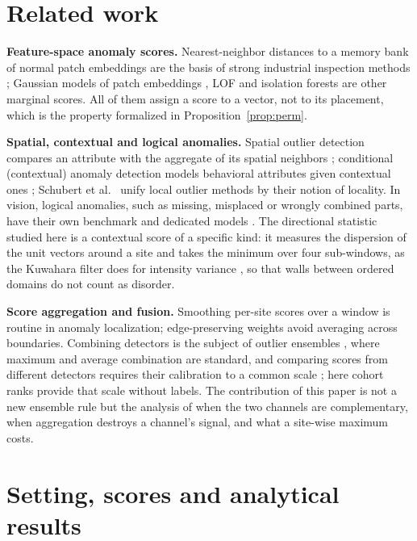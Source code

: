 \documentclass[preprint,review,12pt]{elsarticle}
\begin{document}
\section{Related work}
\textbf{Feature-space anomaly scores.} Nearest-neighbor distances to a memory bank of normal patch embeddings are the basis of strong industrial inspection methods \citep{Roth2022}; Gaussian models of patch embeddings \citep{Defard2021}, LOF \citep{Breunig2000} and isolation forests \citep{Liu2008} are other marginal scores. All of them assign a score to a vector, not to its placement, which is the property formalized in Proposition~\ref{prop:perm}.

\textbf{Spatial, contextual and logical anomalies.} Spatial outlier detection compares an attribute with the aggregate of its spatial neighbors \citep{Shekhar2003}; conditional (contextual) anomaly detection models behavioral attributes given contextual ones \citep{Song2007}; Schubert et al.~\citep{Schubert2014} unify local outlier methods by their notion of locality. In vision, logical anomalies, such as missing, misplaced or wrongly combined parts, have their own benchmark \citep{Bergmann2022} and dedicated models \citep{Batzner2024}. The directional statistic studied here is a contextual score of a specific kind: it measures the dispersion of the unit vectors around a site \citep{Mardia2000,Banerjee2005} and takes the minimum over four sub-windows, as the Kuwahara filter does for intensity variance \citep{Kuwahara1976}, so that walls between ordered domains do not count as disorder.

\textbf{Score aggregation and fusion.} Smoothing per-site scores over a window is routine in anomaly localization; edge-preserving weights \citep{Tomasi1998} avoid averaging across boundaries. Combining detectors is the subject of outlier ensembles \citep{Aggarwal2015}, where maximum and average combination are standard, and comparing scores from different detectors requires their calibration to a common scale \citep{Kriegel2011}; here cohort ranks provide that scale without labels. The contribution of this paper is not a new ensemble rule but the analysis of when the two channels are complementary, when aggregation destroys a channel's signal, and what a site-wise maximum costs.


\section{Setting, scores and analytical results}
\label{sec:theory}
\end{document}
